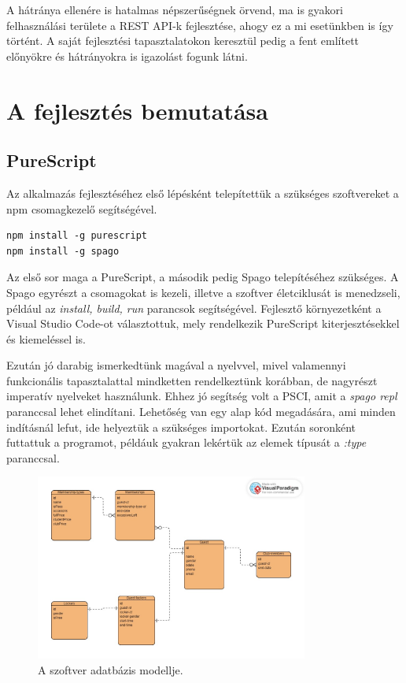 \documentclass[12pt]{article}
\begin{document}
A hátránya ellenére is hatalmas népszerűségnek örvend, ma is gyakori felhasználási területe a REST API-k fejlesztése, ahogy ez a mi esetünkben is így történt. A saját fejlesztési tapasztalatokon keresztül pedig a fent említett előnyökre és hátrányokra is igazolást fogunk látni.

\newpage
\section{A fejlesztés bemutatása}

\subsection{PureScript}

Az alkalmazás fejlesztéséhez első lépésként telepítettük a szükséges szoftvereket a npm csomagkezelő segítségével. 
\begin{verbatim}
npm install -g purescript
npm install -g spago
\end{verbatim}

Az első sor maga a PureScript, a második pedig Spago telepítéséhez szükséges. A Spago egyrészt a csomagokat is kezeli, illetve a szoftver életciklusát is menedzseli, például az \textit{install, build, run} parancsok segítségével.  Fejlesztő környezetként a Visual Studio Code-ot választottuk, mely rendelkezik PureScript kiterjesztésekkel és kiemeléssel is.

Ezután jó darabig ismerkedtünk magával a nyelvvel, mivel valamennyi funkcionális tapasztalattal mindketten rendelkeztünk korábban, de nagyrészt imperatív nyelveket használunk.  Ehhez jó segítség volt a PSCI, amit a \textit{spago repl} paranccsal lehet elindítani. Lehetőség van egy alap kód megadására, ami minden indításnál lefut, ide helyeztük a szükséges importokat. Ezután soronként futtattuk a programot, példáuk gyakran lekértük az elemek típusát a \textit{:type} paranccsal.

\begin{figure}[h!]
\includegraphics[width=0.8\textwidth]{database}
\caption{A szoftver adatbázis modellje.}
\end{figure}
\end{document}
